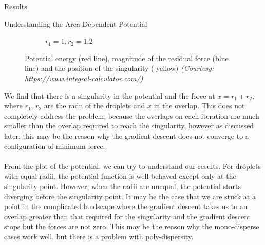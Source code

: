 \documentclass[12pt]{article}
\begin{document}
\begin{section}{Results}
\begin{subsection}{Understanding the Area-Dependent Potential}
\begin{figure}[h!]
\begin{subfigure}{0.5\textwidth}
        \caption{$r_1 = 1 ,  r_2 = 1.2 $}
        \label{fig:sub2}
    \end{subfigure}
    \caption{Potential energy (\color{red}red line\color{}), magnitude of the residual force (\color{blue}blue line\color{}) and the position of the singularity (\color{yellow} yellow\color{}) \textit{(Courtesy: https://www.integral-calculator.com/)}}
\end{figure}
\par \noindent We find that there is a singularity in the potential and the force at $x = r_1 + r_2$, where $r_1$, $r_2$ are the radii of the droplets and $x$ in the overlap. This does not completely address the problem, because the overlaps on each iteration are much smaller than the overlap required to reach the singularity, however as discussed later, this may be the reason why the gradient descent does not converge to a configuration of minimum force. \\\\
From the plot of the potential, we can try to understand our results. For droplets with equal radii, the potential function is well-behaved except only at the singularity point. However, when the radii are unequal, the potential starts diverging before the singularity point. It may be the case that we are stuck at a point in the complicated landscape where the gradient descent takes us to an overlap greater than that required for the singularity and the gradient descent stops but the forces are not zero. This may be the reason why the mono-disperse cases work well, but there is a problem with poly-dispersity. 
\end{subsection}


\end{section}
\end{document}
